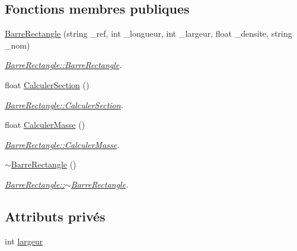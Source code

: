 \subsection*{Fonctions membres publiques}
\begin{DoxyCompactItemize}
\item 
\hyperlink{class_barre_rectangle_ac11537dbce113614362ff8e67187504d}{Barre\+Rectangle} (string \+\_\+ref, int \+\_\+longueur, int \+\_\+largeur, float \+\_\+densite, string \+\_\+nom)
\begin{DoxyCompactList}\small\item\em \hyperlink{class_barre_rectangle_ac11537dbce113614362ff8e67187504d}{Barre\+Rectangle\+::\+Barre\+Rectangle}. \end{DoxyCompactList}\item 
float \hyperlink{class_barre_rectangle_aca359a79b9e74a94867ccaa4341f51ae}{Calculer\+Section} ()
\begin{DoxyCompactList}\small\item\em \hyperlink{class_barre_rectangle_aca359a79b9e74a94867ccaa4341f51ae}{Barre\+Rectangle\+::\+Calculer\+Section}. \end{DoxyCompactList}\item 
float \hyperlink{class_barre_rectangle_a9edb62e31a33790146eb0fd2b3fd7e4e}{Calculer\+Masse} ()
\begin{DoxyCompactList}\small\item\em \hyperlink{class_barre_rectangle_a9edb62e31a33790146eb0fd2b3fd7e4e}{Barre\+Rectangle\+::\+Calculer\+Masse}. \end{DoxyCompactList}\item 
\hyperlink{class_barre_rectangle_aaf9fee36e7a6b914af9fc0bff25674e4}{$\sim$\+Barre\+Rectangle} ()
\begin{DoxyCompactList}\small\item\em \hyperlink{class_barre_rectangle_aaf9fee36e7a6b914af9fc0bff25674e4}{Barre\+Rectangle\+::$\sim$\+Barre\+Rectangle}. \end{DoxyCompactList}\end{DoxyCompactItemize}
\subsection*{Attributs privés}
\begin{DoxyCompactItemize}
\item 
int \hyperlink{class_barre_rectangle_a6805bad77d9cbdf787a911e0841d6d35}{largeur}
\end{DoxyCompactItemize}

